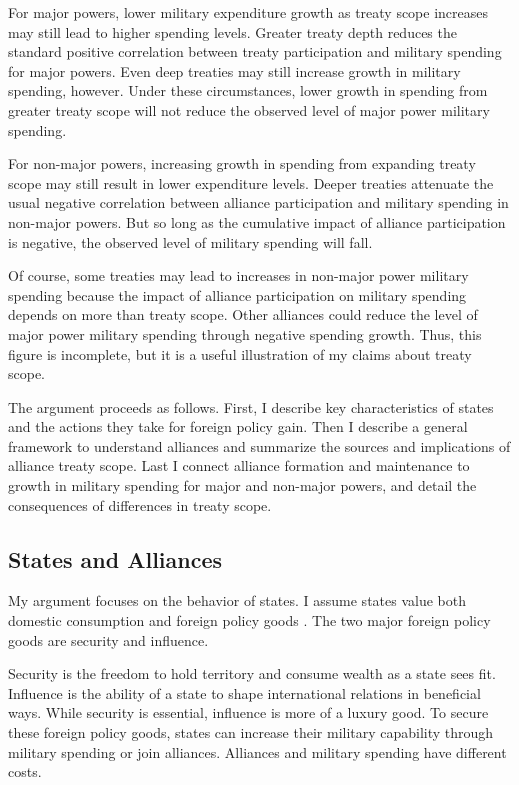 \documentclass[12pt]{article}
\begin{document}
For major powers, lower military expenditure growth as treaty scope increases may still lead to higher spending levels. 
Greater treaty depth reduces the standard positive correlation between treaty participation and military spending for major powers. 
Even deep treaties may still increase growth in military spending, however. 
Under these circumstances, lower growth in spending from greater treaty scope will not reduce the observed level of major power military spending. 


For non-major powers, increasing growth in spending from expanding treaty scope may still result in lower expenditure levels. 
Deeper treaties attenuate the usual negative correlation between alliance participation and military spending in non-major powers. 
But so long as the cumulative impact of alliance participation is negative, the observed level of military spending will fall. 


Of course, some treaties may lead to increases in non-major power military spending because the impact of alliance participation on military spending depends on more than treaty scope. 
Other alliances could reduce the level of major power military spending through negative spending growth.
Thus, this figure is incomplete, but it is a useful illustration of my claims about treaty scope. 


The argument proceeds as follows.
First, I describe key characteristics of states and the actions they take for foreign policy gain. 
Then I describe a general framework to understand alliances and summarize the sources and implications of alliance treaty scope. 
Last I connect alliance formation and maintenance to growth in military spending for major and non-major powers, and detail the consequences of differences in treaty scope.  



\subsection{States and Alliances}


My argument focuses on the behavior of states. 
I assume states value both domestic consumption and foreign policy goods \citep{Powell1993, Fearon2018}. 
The two major foreign policy goods are security and influence. 


Security is the freedom to hold territory and consume wealth as a state sees fit. 
Influence is the ability of a state to shape international relations in beneficial ways. 
While security is essential, influence is more of a luxury good. 
To secure these foreign policy goods, states can increase their military capability through military spending or join alliances. 
Alliances and military spending have different costs. 
\end{document}
